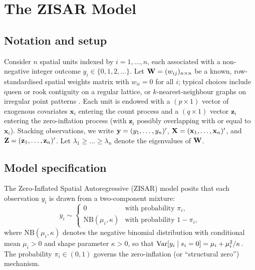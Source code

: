 \section{The ZISAR Model}\label{sec:model}

\subsection{Notation and setup}\label{sec:model_notation}

Consider $n$ spatial units indexed by $i = 1,\ldots,n$, each associated with a non-negative integer outcome $y_i \in \{0,1,2,\ldots\}$.
Let $\mathbf{W} = (w_{ij})_{n \times n}$ be a known, row-standardised spatial weights matrix with $w_{ii}=0$ for all $i$; typical choices include queen or rook contiguity on a regular lattice, or $k$-nearest-neighbour graphs on irregular point patterns \citep{anselin1988,arbia2006}.
Each unit is endowed with a $(p \times 1)$ vector of exogenous covariates $\mathbf{x}_i$ entering the count process and a $(q \times 1)$ vector $\mathbf{z}_i$ entering the zero-inflation process (with $\mathbf{z}_i$ possibly overlapping with or equal to $\mathbf{x}_i$).
Stacking observations, we write $\mathbf{y} = (y_1,\ldots,y_n)'$, $\mathbf{X} = (\mathbf{x}_1,\ldots,\mathbf{x}_n)'$, and $\mathbf{Z} = (\mathbf{z}_1,\ldots,\mathbf{z}_n)'$.
Let $\lambda_1 \geq \ldots \geq \lambda_n$ denote the eigenvalues of $\mathbf{W}$.

\subsection{Model specification}\label{sec:model_spec}

The Zero-Inflated Spatial Autoregressive (ZISAR) model posits that each observation $y_i$ is drawn from a two-component mixture:
\begin{equation}\label{eq:mixture}
  y_i \sim
  \begin{cases}
    0 & \text{with probability } \pi_i, \\
    \mathrm{NB}(\mu_i, \kappa) & \text{with probability } 1-\pi_i,
  \end{cases}
\end{equation}
where $\mathrm{NB}(\mu_i,\kappa)$ denotes the negative binomial distribution with conditional mean $\mu_i > 0$ and shape parameter $\kappa > 0$, so that $\mathrm{Var}[y_i \mid s_i=0] = \mu_i + \mu_i^2/\kappa$.
The probability $\pi_i \in (0,1)$ governs the zero-inflation (or ``structural zero'') mechanism.

